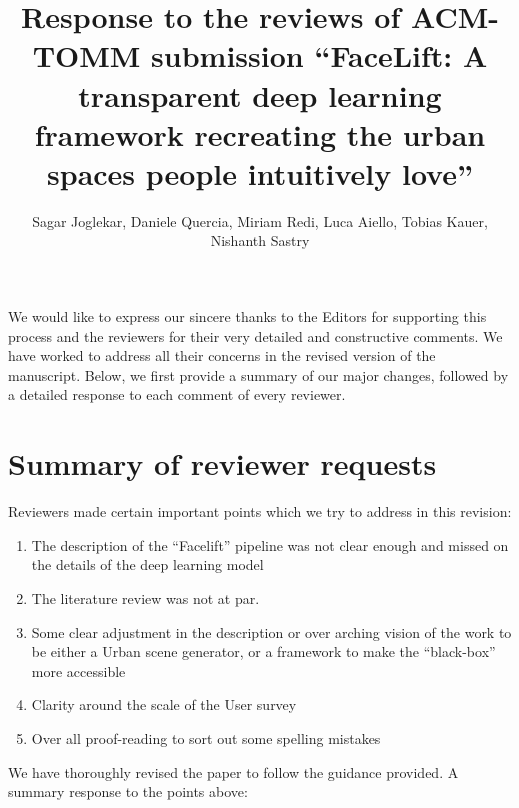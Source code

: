 \documentclass{paper}
\newenvironment{myquote}
{\definecolor{shadecolor}{rgb}{0.9,0.95,1} \begin{shaded*} \sf \em}
{\em\end{shaded*}}
\newenvironment{myquoteOrange}
{\definecolor{shadecolor}{rgb}{1,0.9,0.83} \begin{shaded*} \sf \em}
{\em\end{shaded*}}
\begin{document}


\title{Response to the reviews of ACM-TOMM submission ``FaceLift: A transparent deep learning framework recreating the urban spaces people intuitively love''}
\author{\small Sagar Joglekar, Daniele Quercia, Miriam Redi, Luca Aiello, Tobias Kauer, Nishanth Sastry}
\maketitle

We would like to express our sincere thanks to the Editors for supporting this process and the reviewers for their very detailed and constructive comments. We have worked to address all their concerns in the revised version of the manuscript. Below, we first provide a summary of our major changes, followed by a detailed response to each comment of every reviewer.

\section*{Summary of reviewer requests}

\begin{myquote}

\noindent Reviewers made certain important points which we try to address in this revision:

\begin{enumerate}
\item The description of the ``Facelift'' pipeline was not clear enough and missed on the details of the deep learning model
\item The literature review was not at par. 
\item Some clear adjustment in the description or over arching vision of the work to be either a Urban scene generator, or a framework to make the ``black-box'' more accessible
\item Clarity around the scale of the User survey
\item Over all proof-reading to sort out some spelling mistakes
\end{enumerate}

\end{myquote}

\noindent We have thoroughly revised the paper to follow the guidance provided. A summary response to the points above:
\end{document}
